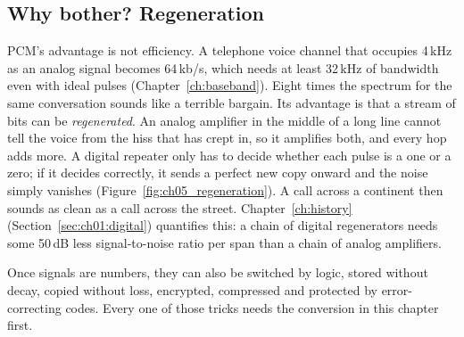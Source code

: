 \subsection{Why bother? Regeneration}

PCM's advantage is not efficiency. A telephone voice channel that occupies 4\,kHz as an analog
signal becomes 64\,kb/s, which needs at least 32\,kHz of bandwidth even with ideal pulses
(Chapter~\ref{ch:baseband}). Eight times the spectrum for the same conversation sounds like a
terrible bargain. Its advantage is that a stream of bits can be \emph{regenerated}. An analog
amplifier in the middle of a long line cannot tell the voice from the hiss that has crept in, so it
amplifies both, and every hop adds more. A digital repeater only has to decide whether each pulse
is a one or a zero; if it decides correctly, it sends a perfect new copy onward and the noise
simply vanishes (Figure~\ref{fig:ch05_regeneration}). A call across a continent then sounds as
clean as a call across the street. Chapter~\ref{ch:history} (Section~\ref{sec:ch01:digital})
quantifies this: a chain of digital regenerators needs some 50\,dB less signal-to-noise ratio per
span than a chain of analog amplifiers.


Once signals are numbers, they can also be switched by logic, stored without decay, copied without
loss, encrypted, compressed and protected by error-correcting codes. Every one of those tricks
needs the conversion in this chapter first.

